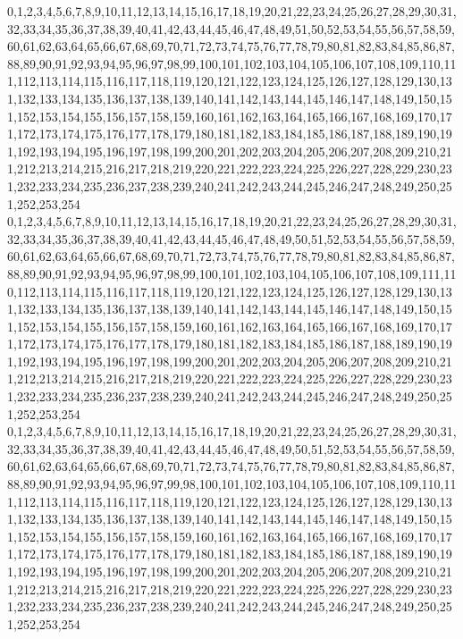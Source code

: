 \documentclass[12pt]{article}
\begin{document}
{0,1,2,3,4,5,6,7,8,9,10,11,12,13,14,15,16,17,18,19,20,21,22,23,24,25,26,27,28,29,30,31,32,33,34,35,36,37,38,39,40,41,42,43,44,45,46,47,48,49,51,50,52,53,54,55,56,57,58,59,60,61,62,63,64,65,66,67,68,69,70,71,72,73,74,75,76,77,78,79,80,81,82,83,84,85,86,87,88,89,90,91,92,93,94,95,96,97,98,99,100,101,102,103,104,105,106,107,108,109,110,111,112,113,114,115,116,117,118,119,120,121,122,123,124,125,126,127,128,129,130,131,132,133,134,135,136,137,138,139,140,141,142,143,144,145,146,147,148,149,150,151,152,153,154,155,156,157,158,159,160,161,162,163,164,165,166,167,168,169,170,171,172,173,174,175,176,177,178,179,180,181,182,183,184,185,186,187,188,189,190,191,192,193,194,195,196,197,198,199,200,201,202,203,204,205,206,207,208,209,210,211,212,213,214,215,216,217,218,219,220,221,222,223,224,225,226,227,228,229,230,231,232,233,234,235,236,237,238,239,240,241,242,243,244,245,246,247,248,249,250,251,252,253,254\\
0,1,2,3,4,5,6,7,8,9,10,11,12,13,14,15,16,17,18,19,20,21,22,23,24,25,26,27,28,29,30,31,32,33,34,35,36,37,38,39,40,41,42,43,44,45,46,47,48,49,50,51,52,53,54,55,56,57,58,59,60,61,62,63,64,65,66,67,68,69,70,71,72,73,74,75,76,77,78,79,80,81,82,83,84,85,86,87,88,89,90,91,92,93,94,95,96,97,98,99,100,101,102,103,104,105,106,107,108,109,111,110,112,113,114,115,116,117,118,119,120,121,122,123,124,125,126,127,128,129,130,131,132,133,134,135,136,137,138,139,140,141,142,143,144,145,146,147,148,149,150,151,152,153,154,155,156,157,158,159,160,161,162,163,164,165,166,167,168,169,170,171,172,173,174,175,176,177,178,179,180,181,182,183,184,185,186,187,188,189,190,191,192,193,194,195,196,197,198,199,200,201,202,203,204,205,206,207,208,209,210,211,212,213,214,215,216,217,218,219,220,221,222,223,224,225,226,227,228,229,230,231,232,233,234,235,236,237,238,239,240,241,242,243,244,245,246,247,248,249,250,251,252,253,254\\
0,1,2,3,4,5,6,7,8,9,10,11,12,13,14,15,16,17,18,19,20,21,22,23,24,25,26,27,28,29,30,31,32,33,34,35,36,37,38,39,40,41,42,43,44,45,46,47,48,49,50,51,52,53,54,55,56,57,58,59,60,61,62,63,64,65,66,67,68,69,70,71,72,73,74,75,76,77,78,79,80,81,82,83,84,85,86,87,88,89,90,91,92,93,94,95,96,97,99,98,100,101,102,103,104,105,106,107,108,109,110,111,112,113,114,115,116,117,118,119,120,121,122,123,124,125,126,127,128,129,130,131,132,133,134,135,136,137,138,139,140,141,142,143,144,145,146,147,148,149,150,151,152,153,154,155,156,157,158,159,160,161,162,163,164,165,166,167,168,169,170,171,172,173,174,175,176,177,178,179,180,181,182,183,184,185,186,187,188,189,190,191,192,193,194,195,196,197,198,199,200,201,202,203,204,205,206,207,208,209,210,211,212,213,214,215,216,217,218,219,220,221,222,223,224,225,226,227,228,229,230,231,232,233,234,235,236,237,238,239,240,241,242,243,244,245,246,247,248,249,250,251,252,253,254\\
}
\end{document}
